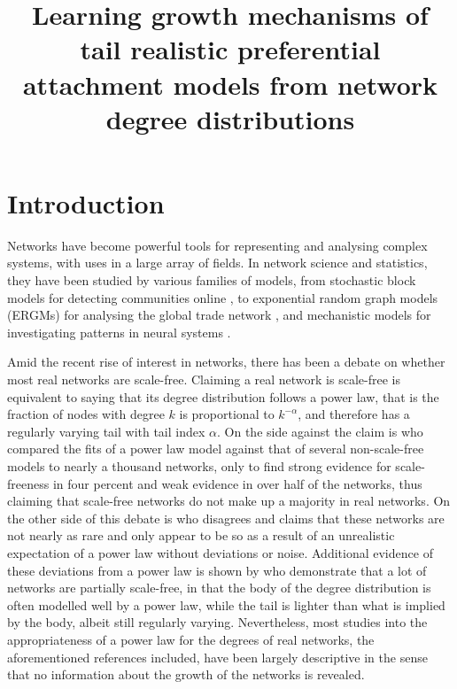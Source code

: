 \documentclass[
  sn-basic,
  10pt,
]{sn-jnl}
\title[Learning growth mechanisms of tail realistic preferential
attachment models from network degree distributions]{Learning growth
mechanisms of tail realistic preferential attachment models from network
degree distributions}
\author*[1]{\fnm{Thomas William} \sur{Boughen}}\email{t.w.boughen1@newcastle.ac.uk}\author[1]{\fnm{Clement} \sur{Lee}}\author[1]{\fnm{Vianey Palacios} \sur{Ramírez}}
\affil[1]{\orgdiv{School of Mathematics, Statistics and
Physics}, \orgname{Newcastle University}}
\theoremstyle{plain}
\theoremstyle{plain}
\theoremstyle{remark}
\begin{document}
\maketitle


\newpage

\section{Introduction}\label{introduction}

Networks have become powerful tools for representing and analysing
complex systems, with uses in a large array of fields. In network
science and statistics, they have been studied by various families of
models, from stochastic block models for detecting communities online
\citep{Latouche11}, to exponential random graph models (ERGMs) for
analysing the global trade network \citep{Setayesh22}, and mechanistic
models for investigating patterns in neural systems \citep{Betzel17}.

Amid the recent rise of interest in networks, there has been a debate on
whether most real networks are scale-free. Claiming a real network is
scale-free is equivalent to saying that its degree distribution follows
a power law, that is the fraction of nodes with degree \(k\) is
proportional to \(k^{-\alpha}\), and therefore has a regularly varying
tail with tail index \(\alpha\). On the side against the claim is
\citet{Broido_2019} who compared the fits of a power law model against
that of several non-scale-free models to nearly a thousand networks,
only to find strong evidence for scale-freeness in four percent and weak
evidence in over half of the networks, thus claiming that scale-free
networks do not make up a majority in real networks. On the other side
of this debate is \citet{Voitalov_2019} who disagrees and claims that
these networks are not nearly as rare and only appear to be so as a
result of an unrealistic expectation of a power law without deviations
or noise. Additional evidence of these deviations from a power law is
shown by \citet{Lee24} who demonstrate that a lot of networks are
partially scale-free, in that the body of the degree distribution is
often modelled well by a power law, while the tail is lighter than what
is implied by the body, albeit still regularly varying. Nevertheless,
most studies into the appropriateness of a power law for the degrees of
real networks, the aforementioned references included, have been largely
descriptive in the sense that no information about the growth of the
networks is revealed.
\end{document}
